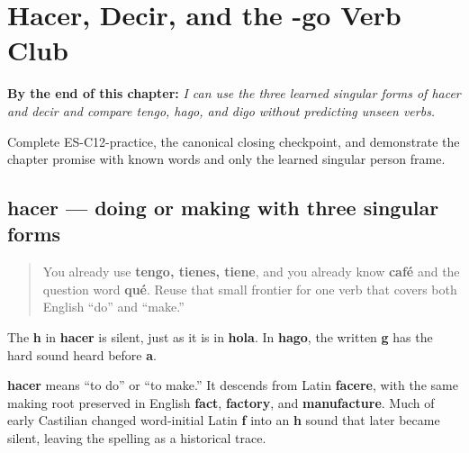 
\chapter{Hacer, Decir, and the -go Verb Club}
\label{ch:yo-go-verbs}

\begin{chapteropening}
\textbf{By the end of this chapter:} \emph{I can use the three learned singular forms of hacer and decir and compare tengo, hago, and digo without predicting unseen verbs.}

Complete ES-C12-practice, the canonical closing checkpoint, and demonstrate the chapter promise with known words and only the learned singular person frame.
\end{chapteropening}

\section[hacer]{hacer — doing or making with three singular forms}

\label{lesson:ES-C12-hacer}



\begin{quote}
You already use \textbf{tengo, tienes, tiene}, and you already know \textbf{café} and the question word \textbf{qué}. Reuse that small frontier for one verb that covers both English “do” and “make.”
\end{quote}

\begin{sounds}
The \textbf{h} in \textbf{hacer} is silent, just as it is in \textbf{hola}. In \textbf{hago}, the written \textbf{g} has the hard sound heard before \textbf{a}.
\end{sounds}

\begin{cousinweb}
\textbf{hacer} means “to do” or “to make.” It descends from Latin \textbf{facere}, with the same making root preserved in English \textbf{fact}, \textbf{factory}, and \textbf{manufacture}. Much of early Castilian changed word-initial Latin \textbf{f} into an \textbf{h} sound that later became silent, leaving the spelling as a historical trace.
\end{cousinweb}


